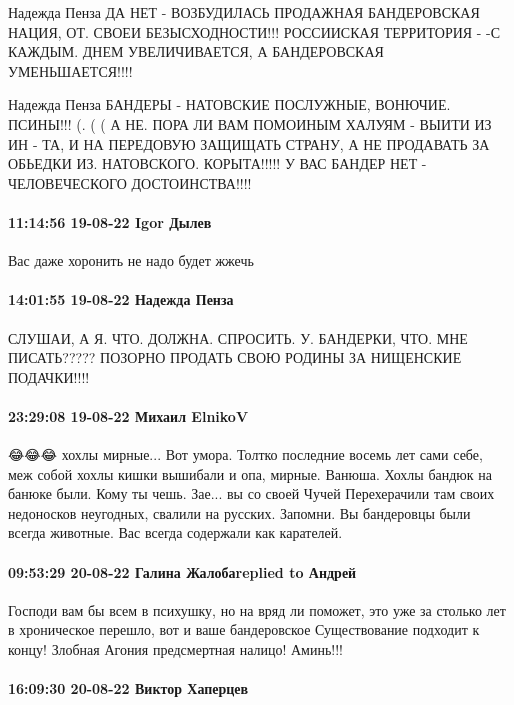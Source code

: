 Надежда Пенза
ДА НЕТ - ВОЗБУДИЛАСЬ ПРОДАЖНАЯ БАНДЕРОВСКАЯ НАЦИЯ, ОТ. СВОЕИ БЕЗЫСХОДНОСТИ!!!
РОССИИСКАЯ ТЕРРИТОРИЯ - -С КАЖДЫМ. ДНЕМ УВЕЛИЧИВАЕТСЯ, А БАНДЕРОВСКАЯ УМЕНЬШАЕТСЯ!!!!

Надежда Пенза
БАНДЕРЫ - НАТОВСКИЕ ПОСЛУЖНЫЕ, ВОНЮЧИЕ. ПСИНЫ!!! (. ( ( А НЕ. ПОРА ЛИ ВАМ ПОМОИНЫМ ХАЛУЯМ - ВЫИТИ ИЗ ИН - ТА, И НА ПЕРЕДОВУЮ ЗАЩИЩАТЬ СТРАНУ, А НЕ ПРОДАВАТЬ ЗА ОБЬЕДКИ ИЗ. НАТОВСКОГО. КОРЫТА!!!!! У ВАС БАНДЕР НЕТ - ЧЕЛОВЕЧЕСКОГО ДОСТОИНСТВА!!!!

\paragraph{11:14:56 19-08-22 Igor Дылев}

Вас даже хоронить не надо будет жжечь

\paragraph{14:01:55 19-08-22 Надежда Пенза}

СЛУШАИ, А Я. ЧТО. ДОЛЖНА. СПРОСИТЬ. У. БАНДЕРКИ, ЧТО. МНЕ ПИСАТЬ????? ПОЗОРНО
ПРОДАТЬ СВОЮ РОДИНЫ ЗА НИЩЕНСКИЕ ПОДАЧКИ!!!!

\paragraph{23:29:08 19-08-22 Михаил ElnikoV}

😂😂😂 хохлы мирные... Вот умора. Толтко последние восемь лет сами себе, меж собой хохлы кишки вышибали и опа, мирные.
Ванюша. Хохлы бандюк на банюке были. Кому ты чешь.
Зае... вы со своей Чучей
Перехерачили там своих недоносков неугодных, свалили на русских.
Запомни. Вы бандеровцы были всегда животные. Вас всегда содержали как карателей.

\paragraph{09:53:29 20-08-22 Галина Жалобаreplied to Андрей}

Господи вам бы всем в психушку, но на вряд ли поможет, это уже за столько лет в
хроническое перешло, вот и ваше бандеровское Существование подходит к концу!
Злобная Агония предсмертная налицо! Аминь!!!

\paragraph{16:09:30 20-08-22 Виктор Хаперцев}

